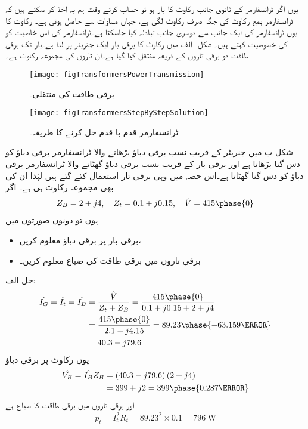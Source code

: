 	یوں اگر ٹرانسفارمر کے ثانوی جانب  رکاوٹ  کا بار ہو تو حساب کرتے وقت ہم یہ اخذ کر سکتے ہیں کہ  ٹرانسفارمر بمع رکاوٹ  کی  جگہ  صرف   رکاوٹ لگی ہے، جہاں  مساوات   سے حاصل ہوتی ہے۔ رکاوٹ کا یوں ٹرانسفارمر کی ایک جانب سے دوسری جانب تبادلہ کیا جاسکتا ہے۔ٹرانسفارمر کی اس خاصیت کو   کی خصوصیت  کہتے ہیں۔
%
شکل -الف میں رکاوٹ  کا برقی بار ایک جنریٹر پر لدا ہے۔بار تک برقی طاقت دو برقی تاروں کے ذریعہ منتقل کیا گیا ہے۔ان تاروں کی مجموعہ رکاوٹ  ہے۔
\begin{figure}
\centering
\texttt{[image: figTransformersPowerTransmission]}
\caption{برقی طاقت کی منتقلی۔}
\label{شکل_ٹرانسفارمر_برقی_طاقت_کی_منتقلی}
\end{figure}
%
\begin{figure}
\centering
\texttt{[image: figTransformersStepByStepSolution]}
\caption{ٹرانسفارمر قدم با قدم حل کرنے کا طریقہ۔}
\label{شکل_ٹرانسفارمر_قدم_با_قدم_حل}
\end{figure}

شکل-ب میں جنریٹر کے قریب نسب برقی دباؤ بڑھانے والا ٹرانسفارمر برقی دباؤ کو دس گنا بڑھاتا ہے اور برقی بار کے قریب نسب برقی دباؤ گھٹانے والا ٹرانسفارمر برقی دباؤ کو دس گنا گھٹاتا ہے۔اس حصہ میں وہی برقی تار استعمال کئے گئے ہیں لہٰذا ان کی بھی مجموعہ رکاوٹ  ہی ہے۔
اگر 
\begin{align*}
Z_B=2+j 4, \quad Z_t=0.1 +j 0.15, \quad \hat{V}=415\phase{0}
\end{align*}
ہوں تو دونوں صورتوں میں
\begin{itemize}
\item
برقی بار پر برقی دباؤ معلوم کریں،
\item
برقی تاروں میں برقی طاقت کی ضیاع معلوم کرین۔
\end{itemize}

حل الف:
\begin{align*}
\hat{I_G}=\hat{I_t}=\hat{I_B}&=\frac{\hat{V}}{Z_t+Z_B}=\frac{415\phase{0}}{0.1+j 0.15+2+j 4}\\
&=\frac{415\phase{0}}{2.1+j 4.15}=89.23\phase{-63.159\degree}\\
&=40.3-j79.6
\end{align*}
یوں رکاوٹ پر برقی دباؤ
\begin{align*}
\hat{V_B}=\hat{I_B} Z_B&=\left(40.3-j79.6 \right) \left( 2+j 4\right)\\
&=399+j2=399\phase{0.287\degree}
\end{align*}
اور برقی تاروں میں برقی طاقت کا ضیاع ہے
\begin{align*}
p_t=I_t^2 R_t=89.23^2 \times 0.1=\SI{796}{\watt}
\end{align*}

